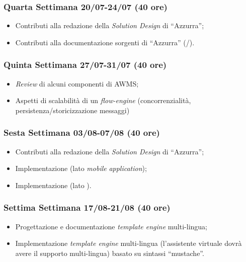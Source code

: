 \begin{trivlist}
\item \subsubsection{Quarta Settimana 20/07-24/07 (40 ore)}
\begin{itemize}
	\item Contributi alla redazione della \emph{Solution Design} di “Azzurra”;
	\item Contributi alla documentazione sorgenti di “Azzurra” (/).
\end{itemize}

\item \subsubsection{Quinta Settimana 27/07-31/07 (40 ore)}
\begin{itemize}
	\item \emph{Review} di alcuni componenti di \gls{AWMS};
	\item Aspetti di scalabilità di un \emph{flow-engine} (concorrenzialità, persistenza/storicizzazione messaggi)
\end{itemize}

\item \subsubsection{Sesta Settimana 03/08-07/08 (40 ore)}
\begin{itemize}
	\item Contributi alla redazione della \emph{Solution Design} di “Azzurra”;
	\item Implementazione \textcolor{SchoolColor}{\ap{[g]}} (lato \emph{mobile} \emph{application});
	\item Implementazione \textcolor{SchoolColor}{\ap{[g]}} (lato ).
\end{itemize}

\item \subsubsection{Settima Settimana 17/08-21/08 (40 ore)}
\begin{itemize}
	\item Progettazione e documentazione \emph{template engine} multi-lingua;
	\item Implementazione \emph{template engine} multi-lingua (l’assistente virtuale dovrà avere il supporto multi-lingua) basato su sintassi “mustache”.
\end{itemize}	


\end{trivlist}
